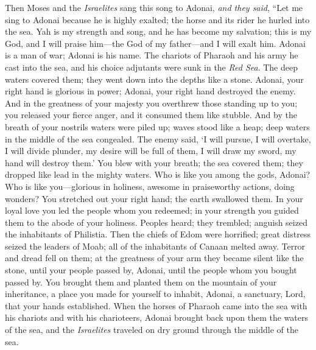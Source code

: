 \begin{biblechapter} %
 Then Moses and the \textit{Israelites} sang this song to Adonai, \textit{and they said},
\verse “Let me sing to Adonai because he is highly exalted; 
the horse and its rider he hurled into the sea.
\verse Yah is my strength and song, and he has become my salvation; 
this is my God, and I will praise him—the God of my father—and I will exalt him.
\verse Adonai is a man of war; Adonai is his name.
\verse The chariots of Pharaoh and his army he cast into the sea, 
and his choice adjutants were sunk in the \textit{Red Sea}.
\verse The deep waters covered them; 
they went down into the depths like a stone.
\verse Adonai, your right hand is glorious in power; 
Adonai, your right hand destroyed the enemy.
\verse And in the greatness of your majesty you overthrew those standing up to you; 
you released your fierce anger, and it consumed them like stubble.
\verse And by the breath of your nostrils waters were piled up; 
waves stood like a heap; 
deep waters in the middle of the sea congealed.
\verse The enemy said, ‘I will pursue, I will overtake, I will divide plunder, 
my desire will be full of them, I will draw my sword, my hand will destroy them.’
\verse You blew with your breath; the sea covered them; 
they dropped like lead in the mighty waters.
\verse Who is like you among the gods, Adonai? 
Who is like you—glorious in holiness, awesome in praiseworthy actions, doing wonders?
\verse You stretched out your right hand; 
the earth swallowed them.
\verse In your loyal love you led the people whom you redeemed; 
in your strength you guided them to the abode of your holiness.
\verse Peoples heard; they trembled; 
anguish seized the inhabitants of Philistia.
\verse Then the chiefs of Edom were horrified; great distress seized the leaders of Moab; 
all of the inhabitants of Canaan melted away.
\verse Terror and dread fell on them; 
at the greatness of your arm they became silent like the stone, 
until your people passed by, Adonai, 
until the people whom you bought passed by.
\verse You brought them and planted them on the mountain of your inheritance, 
a place you made for yourself to inhabit, Adonai, 
a sanctuary, Lord, that your hands established.
\verse When the horses of Pharaoh came into the sea with his chariots and with his charioteers, Adonai brought back upon them the waters of the sea, and the \textit{Israelites} traveled on dry ground through the middle of the sea.

\end{biblechapter}
